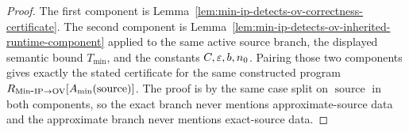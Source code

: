 \begin{proof}
  The first component is
  Lemma~\ref{lem:min-ip-detects-ov-correctness-certificate}.  The second
  component is
  Lemma~\ref{lem:min-ip-detects-ov-inherited-runtime-component} applied to the
  same active source branch, the displayed semantic bound $T_{\min}$, and the
  constants $C,\varepsilon,b,n_0$.  Pairing those two components gives exactly the
  stated certificate for the same constructed program
  $R_{\mathrm{Min\mbox{-}IP}\to\mathrm{OV}}[A_{\min}(\operatorname{source})]$.  The proof is by the
  same case split on $\operatorname{source}$ in both components, so the exact
  branch never mentions approximate-source data and the approximate branch
  never mentions exact-source data.
\end{proof}

